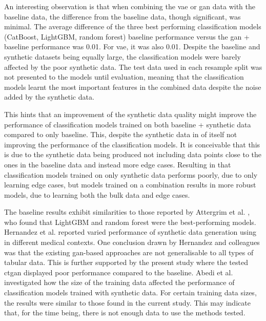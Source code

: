 \documentclass[12pt, a4paper]{article}
\begin{document}
An interesting observation is that when combining the \acrshort{vae} or \acrshort{gan} data with the baseline data, the
difference from the baseline data, though significant, was minimal. The average difference of the three best performing
classification models (CatBoost, LightGBM, random forest) baseline performance versus the \acrshort{gan} + baseline
performance was 0.01. For \acrshort{vae}, it was also 0.01. Despite the baseline and synthetic datasets being equally
large, the classification models were barely affected by the poor synthetic data. The test data used in each resample
split was not presented to the models until evaluation, meaning that the classification models learnt the most
important features in the combined data despite the noise added by the synthetic data.

This hints that an improvement of the synthetic data quality might improve the performance of classification models
trained on both baseline + synthetic data compared to only baseline. This, despite the synthetic data in of itself not
improving the performance of the classification models. It is conceivable that this is due to the synthetic data being
produced not including data points close to the ones in the baseline data and instead more edge cases. Resulting in
that classification models trained on only synthetic data performs poorly, due to only learning edge cases, but models
trained on a combination results in more robust models, due to learning both the bulk data and edge cases.

The baseline results exhibit similarities to those reported by Attergrim et al. \cite{attergrim_predicting_2023}, who
found that LightGBM and random forest were the best-performing models. Hernandez et al. \cite{hernandez_synthetic_2022}
reported varied performance of synthetic data generation using  in different medical contexts. One
conclusion drawn by Hernandez and colleagues was that the existing \acrlong{gan}-based approaches are not generalisable
to all types of tabular data. This is further supported by the present study where the tested \acrshort{ctgan}
displayed poor performance compared to the baseline. Abedi et al. \cite{abedi_gan-based_2022} investigated how the size
of the training data affected the performance of classification models trained with synthetic data. For certain
training data sizes, the results were similar to those found in the current study. This may indicate that, for the time
being, there is not enough data to use the methods tested.
\end{document}
